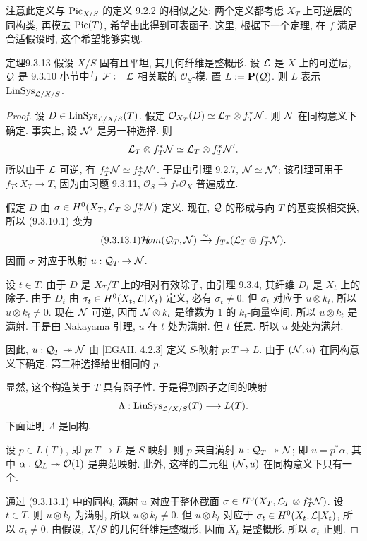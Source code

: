 注意此定义与 $\operatorname{Pic}_{X/S}$ 的定义 9.2.2 的相似之处: 两个定义都考虑 $X_T$ 上可逆层的同构类, 再模去 $\operatorname{Pic}(T)$, 希望由此得到可表函子. 这里, 根据下一个定理, 在 $f$ 满足合适假设时, 这个希望能够实现.

\begin{origstatement}{定理}{9.3.13}\label{ch09s03:thm9313}
假设 $X/S$ 固有且平坦, 其几何纤维是整概形. 设 $\mathcal L$ 是 $X$ 上的可逆层, $\mathcal Q$ 是 9.3.10 小节中与 $\mathcal F:=\mathcal L$ 相关联的 $\mathcal O_S$-模. 置 $L:=\mathbf P(\mathcal Q)$. 则 $L$ 表示 $\operatorname{LinSys}_{\mathcal L/X/S}$.
\end{origstatement}
\begin{proof}
设 $D\in\operatorname{LinSys}_{\mathcal L/X/S}(T)$. 假定 $\mathcal O_{X_T}(D)\simeq\mathcal L_T\otimes f_T^*\mathcal N$. 则 $\mathcal N$ 在同构意义下确定. 事实上, 设 $\mathcal N'$ 是另一种选择. 则
\[
\mathcal L_T\otimes f_T^*\mathcal N\simeq\mathcal L_T\otimes f_T^*\mathcal N'.
\]
所以由于 $\mathcal L$ 可逆, 有 $f_T^*\mathcal N\simeq f_T^*\mathcal N'$. 于是由引理 9.2.7, $\mathcal N\simeq\mathcal N'$; 该引理可用于 $f_T:X_T\to T$, 因为由习题 9.3.11, $\mathcal O_S\xrightarrow{\sim}f_*\mathcal O_X$ 普遍成立.

假定 $D$ 由 $\sigma\in H^0(X_T,\mathcal L_T\otimes f_T^*\mathcal N)$ 定义. 现在, $\mathcal Q$ 的形成与向 $T$ 的基变换相交换, 所以 (9.3.10.1) 变为
\begin{equation}
\tag{9.3.13.1}\label{ch09s03:eq93131}
\mathcal H\!om(\mathcal Q_T,\mathcal N)\xrightarrow{\sim}f_{T*}(\mathcal L_T\otimes f_T^*\mathcal N).
\end{equation}
因而 $\sigma$ 对应于映射 $u:\mathcal Q_T\to\mathcal N$.

设 $t\in T$. 由于 $D$ 是 $X_T/T$ 上的相对有效除子, 由引理 9.3.4, 其纤维 $D_t$ 是 $X_t$ 上的除子. 由于 $D_t$ 由 $\sigma_t\in H^0(X_t,\mathcal L|X_t)$ 定义, 必有 $\sigma_t\ne0$. 但 $\sigma_t$ 对应于 $u\otimes k_t$, 所以 $u\otimes k_t\ne0$. 现在 $\mathcal N$ 可逆, 因而 $\mathcal N\otimes k_t$ 是维数为 $1$ 的 $k_t$-向量空间. 所以 $u\otimes k_t$ 是满射. 于是由 Nakayama 引理, $u$ 在 $t$ 处为满射. 但 $t$ 任意. 所以 $u$ 处处为满射.

因此, $u:\mathcal Q_T\twoheadrightarrow\mathcal N$ 由 [EGAII, 4.2.3] 定义 $S$-映射 $p:T\to L$. 由于 $(\mathcal N,u)$ 在同构意义下确定, 第二种选择给出相同的 $p$.

显然, 这个构造关于 $T$ 具有函子性. 于是得到函子之间的映射
\[
\Lambda:\operatorname{LinSys}_{\mathcal L/X/S}(T)\longrightarrow L(T).
\]
下面证明 $\Lambda$ 是同构.

设 $p\in L(T)$, 即 $p:T\to L$ 是 $S$-映射. 则 $p$ 来自满射 $u:\mathcal Q_T\twoheadrightarrow\mathcal N$; 即 $u=p^*\alpha$, 其中 $\alpha:\mathcal Q_L\twoheadrightarrow\mathcal O(1)$ 是典范映射. 此外, 这样的二元组 $(\mathcal N,u)$ 在同构意义下只有一个.

通过 (9.3.13.1) 中的同构, 满射 $u$ 对应于整体截面 $\sigma\in H^0(X_T,\mathcal L_T\otimes f_T^*\mathcal N)$. 设 $t\in T$. 则 $u\otimes k_t$ 为满射, 所以 $u\otimes k_t\ne0$. 但 $u\otimes k_t$ 对应于 $\sigma_t\in H^0(X_t,\mathcal L|X_t)$, 所以 $\sigma_t\ne0$. 由假设, $X/S$ 的几何纤维是整概形, 因而 $X_t$ 是整概形. 所以 $\sigma_t$ 正则.


\end{proof}
